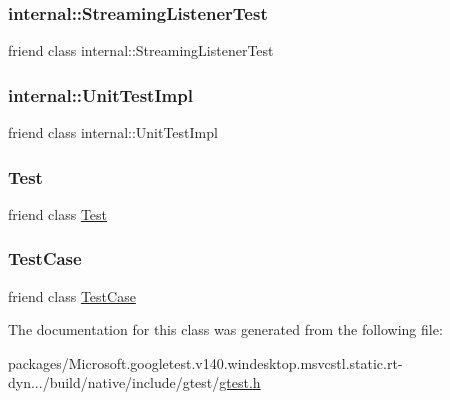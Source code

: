 \subsubsection{\texorpdfstring{internal::StreamingListenerTest}{internal::StreamingListenerTest}}
{\footnotesize\ttfamily friend class internal\+::\+Streaming\+Listener\+Test\hspace{0.3cm}{\ttfamily [friend]}}

\mbox{\label{classtesting_1_1_test_info_acc0a5e7573fd6ae7ad1878613bb86853}} 
\subsubsection{\texorpdfstring{internal::UnitTestImpl}{internal::UnitTestImpl}}
{\footnotesize\ttfamily friend class internal\+::\+Unit\+Test\+Impl\hspace{0.3cm}{\ttfamily [friend]}}

\mbox{\label{classtesting_1_1_test_info_a5b78b1c2e1fa07ffed92da365593eaa4}} 
\subsubsection{\texorpdfstring{Test}{Test}}
{\footnotesize\ttfamily friend class \mbox{\hyperlink{classtesting_1_1_test}{Test}}\hspace{0.3cm}{\ttfamily [friend]}}

\mbox{\label{classtesting_1_1_test_info_aff779e55b06adfa7c0088bd10253f0f0}} 
\subsubsection{\texorpdfstring{TestCase}{TestCase}}
{\footnotesize\ttfamily friend class \mbox{\hyperlink{classtesting_1_1_test_case}{Test\+Case}}\hspace{0.3cm}{\ttfamily [friend]}}



The documentation for this class was generated from the following file\+:\begin{DoxyCompactItemize}
\item 
packages/\+Microsoft.\+googletest.\+v140.\+windesktop.\+msvcstl.\+static.\+rt-\/dyn.../build/native/include/gtest/\mbox{\hyperlink{gtest_8h}{gtest.\+h}}\end{DoxyCompactItemize}
